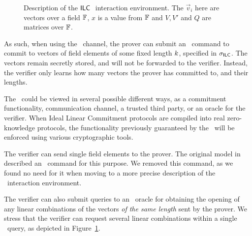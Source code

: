 \begin{figure}[htb]
\caption{Description of the $\mathsf{ILC}~$ interaction environment. The $\vec{v}_i$ here are vectors over a field $\mathbb{F}$, $x$ is a value from $\mathbb{F}$ and $V, V'$ and $Q$ are matrices over $\mathbb{F}$.}\label{ILCSyntaxFigure11}
\end{figure}

As such, when using the \ILC\ channel, the prover can submit an \ILCcommit\ command to commit to
vectors of field elements of some fixed length $k$, specified in $\mathsf{\sigma}_{\mathsf{ILC}}$. The vectors remain secretly stored, and will not be forwarded to the verifier. Instead, the verifier only learns how many vectors the prover has committed to, and their lengths.

The \ILC\ could be viewed in several possible different ways, as a commitment functionality, communication channel, a trusted third party, or an oracle for the verifier. When Ideal Linear Commitment protocols are compiled into real zero-knowledge protocols, the functionality previously guaranteed by the \ILC\ will be enforced using various cryptographic tools.

The verifier can send single field elements to the prover. The original model in \cite{BootleCGGHJ17} described an \ILCsend\ command for this purpose. We removed this command, as we found no need for it when moving to a more precise description of the \ILC\ interaction environment.

The verifier can also submit queries to an \ILCopen\ oracle for obtaining the opening of any linear combinations of the vectors \emph{of the same length} sent by the prover. We stress that the verifier can request several linear combinations within a single \ILCopen\ query, as depicted in Figure~\ref{ILCSyntaxFigure11}.

